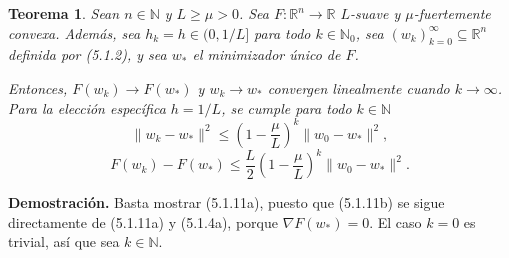 \documentclass[11pt]{report}
\newenvironment{tcolorbox}[1][]{\par\medskip\noindent\ignorespaces}{\par\medskip}
\theoremstyle{definition}
\theoremstyle{plain}
\newtheorem{teorema}[definicion]{Teorema}
\numberwithin{equation}{section}
\begin{document}
\begin{tcolorbox}[colback=blue!8, colframe=blue!8, boxrule=0pt]
\begin{teorema}
Sean \(n\in\mathbb{N}\) y \(L\geq \mu>0\). Sea \(F:\mathbb{R}^n\to\mathbb{R}\) \(L\)-suave y \(\mu\)-fuertemente convexa. Además, sea \(h_k=h\in(0,1/L]\) para todo \(k\in\mathbb{N}_0\), sea \((w_k)_{k=0}^{\infty}\subseteq\mathbb{R}^n\) definida por (5.1.2), y sea \(w_*\) el minimizador único de \(F\).

Entonces, \(F(w_k)\to F(w_*)\) y \(w_k\to w_*\) convergen linealmente cuando \(k\to\infty\). Para la elección específica \(h=1/L\), se cumple para todo \(k\in\mathbb{N}\)
\begin{equation*}
    \|w_k-w_*\|^2
    \leq
    \left(1-\frac{\mu}{L}\right)^k
    \|w_0-w_*\|^2,
    \tag{5.1.11a}
\end{equation*}
\begin{equation*}
    F(w_k)-F(w_*)
    \leq
    \frac{L}{2}
    \left(1-\frac{\mu}{L}\right)^k
    \|w_0-w_*\|^2.
    \tag{5.1.11b}
\end{equation*}
\end{teorema}
\end{tcolorbox}

\textbf{Demostración.} Basta mostrar (5.1.11a), puesto que (5.1.11b) se sigue directamente de (5.1.11a) y (5.1.4a), porque \(\nabla F(w_*)=0\). El caso \(k=0\) es trivial, así que sea \(k\in\mathbb{N}\).
\end{document}
